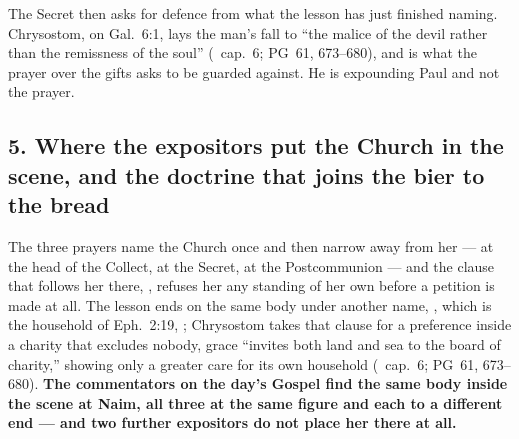 The Secret then asks for defence from what the lesson has just finished
naming. Chrysostom, on Gal.\ 6:1, lays the man's fall to ``the malice of the
devil rather than the remissness of the soul'' (\ cap.~6; PG~61,
673--680), and  is what the prayer
over the gifts asks to be guarded against. He is expounding Paul and not the
prayer.

\subsection*{5. Where the expositors put the Church in the scene, and the doctrine that joins the bier to the bread}

The three prayers name the Church once and then narrow away from her ---
 at the head of the Collect,  at the Secret,
 at the Postcommunion --- and the clause that
follows her there, , refuses
her any standing of her own before a petition is made at all. The lesson ends
on the same body under another name, , which is the household of Eph.\ 2:19, ; Chrysostom takes that clause for a preference inside a charity that
excludes nobody, grace ``invites both land and sea to the board of charity,''
showing only a greater care for its own household (\ cap.~6;
PG~61, 673--680). \textbf{The commentators on the day's Gospel find the same
body inside the scene at Naim, all three at the same figure and each to a
different end --- and two further expositors do not place her there at all.}

